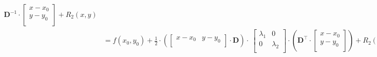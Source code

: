 \begin{bevis}
\begin{equation}
\begin{aligned}
                                          \mathbf{D}^{-1}  \cdot \left[
                                                                                   \begin{array}{c}
                                                                                         x-x_{0}  \\
                                                                                         y-y_{0}  \\
                                                                                   \end{array}                                                                                \right] + R_{2}(x,y)\\
&= f(x_{0}, y_{0}) + \frac{1}{2}\cdot \left( \left[
                                          \begin{array}{cc}
                                            x-x_{0} & y-y_{0} \\
                                          \end{array}
                                        \right] \cdot \mathbf{D}\right)\cdot\ \left[
                                                                               \begin{array}{cc}
                                                                                 \lambda_{1} & 0 \\
                                                                                 0 & \lambda_{2} \\
                                                                               \end{array}
                                                                             \right] \cdot
                                         \left( \mathbf{D}^{\top}  \cdot \left[
                                                                                   \begin{array}{c}
                                                                                         x-x_{0}  \\
                                                                                         y-y_{0}  \\
                                                                                   \end{array}                                                                                \right] \right) + R_{2}(x,y) \quad ,
\end{aligned}

\end{equation}
\end{bevis}
